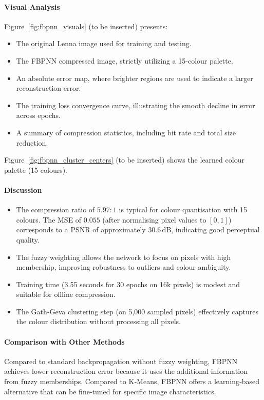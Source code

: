 \paragraph{Visual Analysis}
Figure~\ref{fig:fbpnn_visuals} (to be inserted) presents:
\begin{itemize}
    \item The original Lenna image used for training and testing.
    \item The FBPNN compressed image, strictly utilizing a 15-colour palette.
    \item An absolute error map, where brighter regions are used to indicate a larger reconstruction error.
    \item The training loss convergence curve, illustrating the smooth decline in error across epochs.
    \item A summary of compression statistics, including bit rate and total size reduction.
\end{itemize}






Figure~\ref{fig:fbpnn_cluster_centers} (to be inserted) shows the learned colour palette (15 colours).

\paragraph{Discussion}
\begin{itemize}
    \item The compression ratio of $5.97:1$ is typical for colour quantisation with 15 colours. The MSE of $0.055$ (after normalising pixel values to $[0,1]$) corresponds to a PSNR of approximately $30.6$ dB, indicating good perceptual quality.
    \item The fuzzy weighting allows the network to focus on pixels with high membership, improving robustness to outliers and colour ambiguity.
    \item Training time (3.55 seconds for 30 epochs on 16k pixels) is modest and suitable for offline compression.
    \item The Gath‑Geva clustering step (on 5,000 sampled pixels) effectively captures the colour distribution without processing all pixels.
\end{itemize}

\paragraph{Comparison with Other Methods}
Compared to standard backpropagation without fuzzy weighting, FBPNN achieves lower reconstruction error because it uses the additional information from fuzzy memberships. Compared to K‑Means, FBPNN offers a learning‑based alternative that can be fine‑tuned for specific image characteristics.

